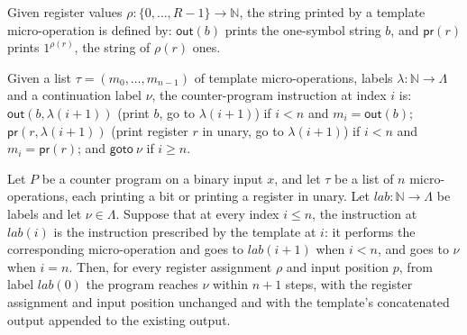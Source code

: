 \begin{definition}
\label{Complexity.CounterProg.MOp.exec}
\leanok
{}
Given register values $\rho : \{0,\dots,R-1\} \to \mathbb{N}$, the string printed
by a template micro-operation is defined by: $\mathsf{out}(b)$ prints the
one-symbol string $b$, and $\mathsf{pr}(r)$ prints $1^{\rho(r)}$, the string of
$\rho(r)$ ones.
\end{definition}

\begin{definition}
\label{Complexity.CounterProg.tmplInstr}
\leanok
{}
Given a list $\tau = (m_0, \dots, m_{n-1})$ of template micro-operations, labels
$\lambda : \mathbb{N} \to \Lambda$ and a continuation label $\nu$, the
counter-program instruction at index $i$ is: $\mathsf{out}(b, \lambda(i+1))$
(print $b$, go to $\lambda(i+1)$) if $i < n$ and $m_i = \mathsf{out}(b)$;
$\mathsf{pr}(r, \lambda(i+1))$ (print register $r$ in unary, go to
$\lambda(i+1)$) if $i < n$ and $m_i = \mathsf{pr}(r)$; and $\mathsf{goto}\ \nu$
if $i \ge n$.
\end{definition}

\begin{theorem}
\label{Complexity.CounterProg.goes_tmpl}
\leanok
{}
Let $P$ be a counter program on a binary input $x$, and let $\tau$ be a list of $n$
micro-operations, each printing a bit or printing a register in unary. Let
$lab:\mathbb{N}\to\Lambda$ be labels and let $\nu\in\Lambda$. Suppose that at every
index $i\le n$, the instruction at $lab(i)$ is the instruction prescribed by the
template at $i$: it performs the corresponding micro-operation and goes to $lab(i+1)$
when $i<n$, and goes to $\nu$ when $i=n$. Then, for every register assignment $\rho$ and
input position $p$, from label $lab(0)$ the program reaches $\nu$ within $n+1$ steps,
with the register assignment and input position unchanged and with the template’s
concatenated output appended to the existing output.
\end{theorem}

